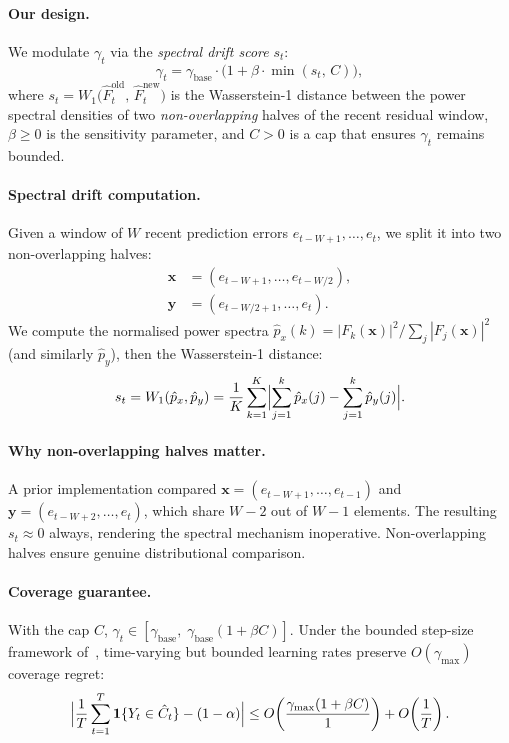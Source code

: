 \paragraph{Our design.}
We modulate $\gamma_t$ via the \emph{spectral drift score} $s_t$:
\begin{equation}\label{eq:aci-spectral}
  \gamma_t = \gamma_{\mathrm{base}} \cdot
    \bigl(1 + \beta \cdot \min(s_t,\, C)\bigr),
\end{equation}
where $s_t = W_1\!\bigl(\hat{F}_{t}^{\mathrm{old}},\,
\hat{F}_{t}^{\mathrm{new}}\bigr)$ is the Wasserstein-1 distance between
the power spectral densities of two \emph{non-overlapping} halves of the
recent residual window, $\beta \ge 0$ is the sensitivity parameter, and
$C > 0$ is a cap that ensures $\gamma_t$ remains bounded.

\paragraph{Spectral drift computation.}
Given a window of $W$ recent prediction errors
$e_{t-W+1},\ldots,e_t$, we split it into two non-overlapping halves:
\begin{align}
  \mathbf{x} &= (e_{t-W+1},\ldots,e_{t-W/2}), \\
  \mathbf{y} &= (e_{t-W/2+1},\ldots,e_t).
\end{align}
We compute the normalised power spectra
$\hat{p}_x(k) = |F_k(\mathbf{x})|^2 / \sum_j |F_j(\mathbf{x})|^2$ (and
similarly $\hat{p}_y$), then the Wasserstein-1 distance:
\begin{equation}\label{eq:w1-spectral}
  s_t = W_1(\hat{p}_x, \hat{p}_y)
      = \frac{1}{K}\sum_{k=1}^{K}
        \Bigl|\sum_{j=1}^{k}\hat{p}_x(j) - \sum_{j=1}^{k}\hat{p}_y(j)\Bigr|.
\end{equation}

\paragraph{Why non-overlapping halves matter.}
A prior implementation compared $\mathbf{x} = (e_{t-W+1},\ldots,e_{t-1})$
and $\mathbf{y} = (e_{t-W+2},\ldots,e_t)$, which share $W-2$ out of $W-1$
elements.  The resulting $s_t \approx 0$ always, rendering the spectral
mechanism inoperative.  Non-overlapping halves ensure genuine distributional
comparison.

\paragraph{Coverage guarantee.}
With the cap $C$, $\gamma_t \in [\gamma_{\mathrm{base}},\;
\gamma_{\mathrm{base}}(1+\beta C)]$.  Under the bounded step-size
framework of~\citet{feldman2022achieving}, time-varying but bounded learning
rates preserve $O(\gamma_{\max})$ coverage regret:
\begin{equation}
  \Bigl|\frac{1}{T}\sum_{t=1}^{T}\mathbf{1}\{Y_t\in\hat{C}_t\}
    - (1-\alpha)\Bigr|
  \le O\!\left(\frac{\gamma_{\max}(1+\beta C)}{1}\right)
  + O\!\left(\frac{1}{T}\right).
\end{equation}

